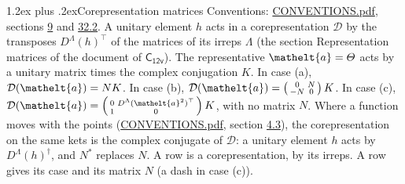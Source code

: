 \documentclass[10pt,a4paper]{article}
\makeatletter
\renewcommand\section{\@startsection{section}{1}{\z@}{-3ex plus -1ex minus -.2ex}%
  {1.2ex plus .2ex}{\normalfont\large\sffamily\bfseries\color{parttitle}}}
\numberwithin{equation}{section}
\newcommand{\eltfont}[1]{{\let\sigma\eltsigma\mathelt{#1}}}
\newcommand{\grp}[1]{\mathsf{#1}}
\newcommand{\elt}[1]{\eltfont{#1}}
\makeatother
\begin{document}
\section{Corepresentation matrices}\label{s:corep_matrices}
Conventions: \href{../../CONVENTIONS.pdf}{CONVENTIONS.pdf}, sections \href{../../../rotation/CONVENTIONS.pdf\#conv.9}{9} and \href{../../CONVENTIONS.pdf\#conv.32.2}{32.2}.
A unitary element $h$ acts in a corepresentation $\mathcal{D}$ by the transposes $D^{\Lambda}(h)^{\top}$ of the matrices of its irreps $\Lambda$ (the section Representation matrices of the document of \href{../../../rotation/data/pdf/C12v.pdf}{$\grp{C_{12v}}$}). The representative $\elt{a} = \varTheta$ acts by a unitary matrix times the complex conjugation $K$.
In case (a), $\mathcal{D}(\elt{a}) = NK$. In case (b), $\mathcal{D}(\elt{a}) = \left(\begin{smallmatrix} 0 & N \\ -N & 0 \end{smallmatrix}\right) K$. In case (c), $\mathcal{D}(\elt{a}) = \left(\begin{smallmatrix} 0 & D^{\Lambda}(\elt{a}^2)^{\top} \\ 1 & 0 \end{smallmatrix}\right) K$, with no matrix $N$.
Where a function moves with the points (\href{../../CONVENTIONS.pdf}{CONVENTIONS.pdf}, section \href{../../../rotation/CONVENTIONS.pdf\#conv.4.3}{4.3}), the corepresentation on the same kets is the complex conjugate of $\mathcal{D}$: a unitary element $h$ acts by $D^{\Lambda}(h)^{\dagger}$, and $N^{*}$ replaces $N$.
A row is a corepresentation, by its irreps. A row gives its case and its matrix $N$ (a dash in case (c)).
\end{document}
